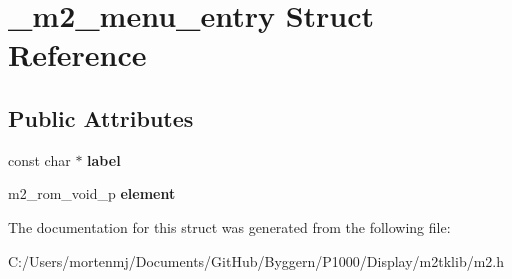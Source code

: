 \hypertarget{struct__m2__menu__entry}{\section{\-\_\-m2\-\_\-menu\-\_\-entry Struct Reference}
\label{struct__m2__menu__entry}
}
\subsection*{Public Attributes}
\begin{DoxyCompactItemize}
\item 
\hypertarget{struct__m2__menu__entry_ab94c541e34fd4e674ee13c9e7d2a21b5}{const char $\ast$ {\bfseries label}}\label{struct__m2__menu__entry_ab94c541e34fd4e674ee13c9e7d2a21b5}

\item 
\hypertarget{struct__m2__menu__entry_a4e6209b2ef33f936f7ad95fa73624c7a}{m2\-\_\-rom\-\_\-void\-\_\-p {\bfseries element}}\label{struct__m2__menu__entry_a4e6209b2ef33f936f7ad95fa73624c7a}

\end{DoxyCompactItemize}


The documentation for this struct was generated from the following file\-:\begin{DoxyCompactItemize}
\item 
C\-:/\-Users/mortenmj/\-Documents/\-Git\-Hub/\-Byggern/\-P1000/\-Display/m2tklib/m2.\-h\end{DoxyCompactItemize}
